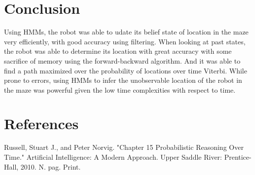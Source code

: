 \documentclass[a4paper]{article}
\begin{document}
\section{Conclusion}

Using HMMs, the robot was able to udate its belief state of location in the maze very efficiently, with good accuracy using filtering. When looking at past states, the robot was able to determine its location with great accuracy with some sacrifice of memory using the forward-backward algorithm. And it was able to find a path maximized over the probability of locations over time Viterbi. While prone to errors, using HMMs to infer the unobservable location of the robot in the maze was powerful given the low time complexities with respect to time.

\section{References}
Russell, Stuart J., and Peter Norvig. "Chapter 15 Probabilistic Reasoning Over Time." Artificial Intelligence: A Modern Approach. Upper Saddle River: Prentice-Hall, 2010. N. pag. Print.
\end{document}
